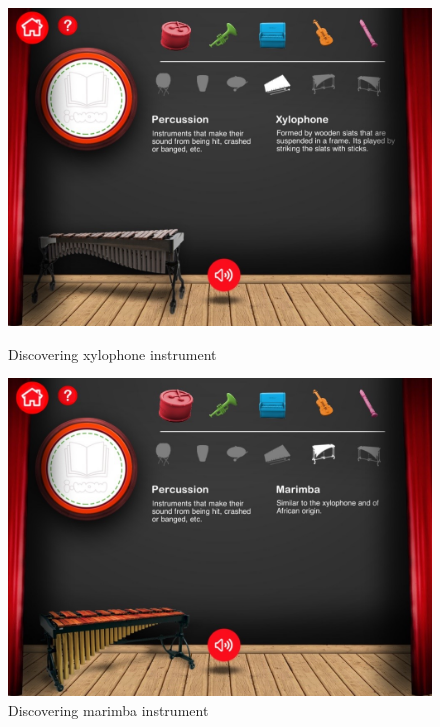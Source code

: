 \begin{figure}[ht!]
  \centering
  \includegraphics[width=350pt]{graphics/additional-screens/discovering_perc_xylophone_screen.jpg}
  \vspace{0.05cm}
  \caption{Discovering xylophone instrument}
  \vspace{0.6cm}

  \includegraphics[width=350pt]{graphics/additional-screens/discovering_perc_marimba_screen.jpg}
  \vspace{0.05cm}
  \caption{Discovering marimba instrument}
\end{figure}

